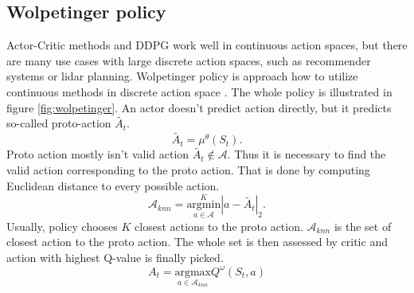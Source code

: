 \subsection{Wolpetinger policy}
Actor-Critic methods and DDPG work well in continuous action spaces, but there are many use cases with large discrete action spaces, such as recommender systems or lidar planning. Wolpetinger policy is approach how to utilize continuous methods in discrete action space \cite{dulac2015}. The whole policy is illustrated in figure \ref{fig:wolpetinger}. An actor doesn't predict action directly, but it predicts so-called proto-action $\tilde{A_t}$.
\begin{equation}
\tilde{A_t} = \mu^\theta(S_t).
\end{equation}
Proto action mostly isn't valid action $\tilde{A_t} \notin \mathcal{A}$. Thus it is necessary to find the valid action corresponding to the proto action. That is done by computing Euclidean distance to every possible action.
\begin{equation} \label{eq:knn}
\mathcal{A}_{knn} = \overset{K}{\underset{a \in \mathcal{A}}{{\text{argmin}}}} | a - \tilde{A_t} |_2 .
\end{equation}
Usually, policy chooses $K$ closest actions to the proto action. $\mathcal{A}_{knn}$ is the set of closest action to the proto action. The whole set is then assessed by critic and action with highest Q-value is finally picked.
\begin{equation}
A_t = \underset{a \in \mathcal{A}_{knn}}{\text{argmax}} Q^\omega(S_t, a)
\end{equation}
